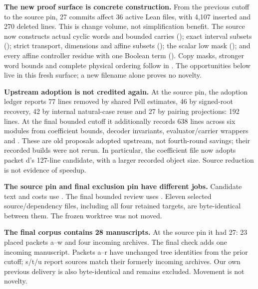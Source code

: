 \textbf{The new proof surface is concrete construction.} From the previous cutoff to the source pin, 27 commits affect 36 active Lean files, with 4,107 inserted and 270 deleted lines. This is change volume, not simplification benefit. The source now constructs actual cyclic words and bounded carries (); exact interval subsets (); strict transport, dimensions and affine subsets (); the scalar low mask (); and every affine controller residue with one Boolean term (). Copy masks, stronger word bounds and complete physical ordering follow in . The opportunities below live in this fresh surface; a new filename alone proves no novelty.

\textbf{Upstream adoption is not credited again.} At the source pin, the adoption ledger reports 77 lines removed by shared Pell estimates, 46 by signed-root recovery, 42 by internal natural-case reuse and 27 by pairing projections: 192 lines. At the final bounded cutoff it additionally records 638 lines across six modules from coefficient bounds, decoder invariants, evaluator/carrier wrappers and . These are old proposals adopted upstream, not fourth-round savings; their recorded builds were not rerun. In particular, the coefficient file now adopts packet d's 127-line candidate, with a larger recorded object size. Source reduction is not evidence of speedup.

\textbf{The source pin and final exclusion pin have different jobs.} Candidate text and costs use . The final bounded review uses . Eleven selected source/dependency files, including all four retained targets, are byte-identical between them. The frozen worktree was not moved.

\textbf{The final corpus contains 28 manuscripts.} At the source pin it had 27: 23 placed packets a--w and four incoming archives. The final check adds one incoming manuscript. Packets a--r have unchanged tree identities from the prior cutoff; s/t/u report sources match their formerly incoming archives. Our own previous delivery is also byte-identical and remains excluded. Movement is not novelty.

